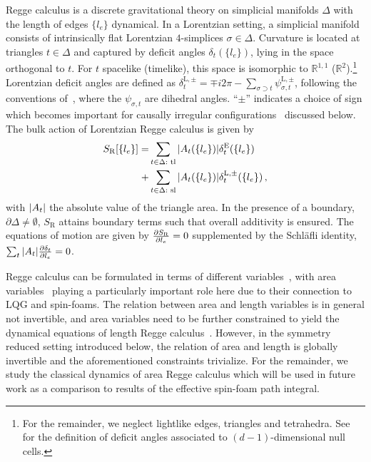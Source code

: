 \documentclass[amsmath,amssymb,aps,twocolumn,superscriptaddress,nofootinbib]{revtex4-1}
\newcommand{\R}{\mathbb{R}}
\newcommand{\Sreg}{S_{\mathrm{R}}}
\begin{document}
Regge calculus is a discrete gravitational theory on simplicial manifolds $\Delta$ with the length of edges $\{l_e\}$ dynamical.
In a Lorentzian setting, a simplicial manifold consists of intrinsically flat Lorentzian $4$-simplices $\sigma\in\Delta$. Curvature is located at triangles $t\in\Delta$ and captured by deficit angles $\delta_t(\{l_e\})$, lying in the space orthogonal to $t$.
For $t$ spacelike (timelike), this space is isomorphic to $\R^{1,1}$ ($\R^2$).\footnote{For the remainder, we neglect lightlike edges, triangles and tetrahedra.
See~\cite{Sorkin:2019llw} for the definition of deficit angles associated to $(d-1)$-dimensional null cells.} 
Lorentzian deficit angles are defined as $\delta_t^{\mathrm{L},\pm} = \mp i 2\pi  -\sum_{\sigma\supset t}\psi_{\sigma,t}^{\mathrm{L},\pm}$, following the conventions of~\cite{Sorkin:2019llw,Asante:2021zzh}, where the $\psi_{\sigma,t}$ are dihedral angles.
\enquote{$\pm$} indicates a choice of sign which becomes important for causally irregular configurations~\cite{Sorkin:2019llw,Asante:2021zzh,Asante:2021phx} discussed below.
The bulk action of Lorentzian Regge calculus is given by~\cite{Asante:2021zzh,Sorkin:2019llw,Regge:1961ct}
%
\begin{equation}\label{eq:general Regge action}
\begin{aligned}
\Sreg[\{l_e\}] =& \sum_{t\in\Delta:\text{ tl}}\abs{A_t(\{l_e\})}\delta_t^{\mathrm{E}}(\{l_e\})\\
+&\sum_{t\in\Delta:\text{ sl}}\abs{A_t(\{l_e\})}\delta_t^{\mathrm{L},\pm}(\{l_e\})\,,
\end{aligned}
\end{equation}
%
with $\abs{A_t}$ the absolute value of the triangle area. 
In the presence of a boundary, $\partial\Delta\neq\emptyset$, $\Sreg$ attains boundary terms such that overall additivity is ensured.
The equations of motion are given by $\pdv{\Sreg}{l_e} = 0$ supplemented by the Schl\"{a}fli identity, $\sum_t \abs{A_t}\pdv{\delta_t}{l_e} = 0$. 

Regge calculus can be formulated in terms of different variables~\cite{Barrett:1994nn,Dittrich:2008va}, with area variables~\cite{Asante:2018wqy,Makela:2000ej,Barrett:1997tx} playing a particularly important role here due to their connection to LQG and spin-foams. 
The relation between area and length variables is in general not invertible, and area variables need to be further constrained to yield the dynamical equations of length Regge calculus~\cite{Barrett:1997tx,Dittrich:2008va,Asante:2021zzh}.
However, in the symmetry reduced setting introduced below, the relation of area and length is globally invertible and the aforementioned constraints trivialize.
For the remainder, we study the classical dynamics of area Regge calculus which will be used in future work as a comparison to results of the effective spin-foam path integral.
\end{document}
